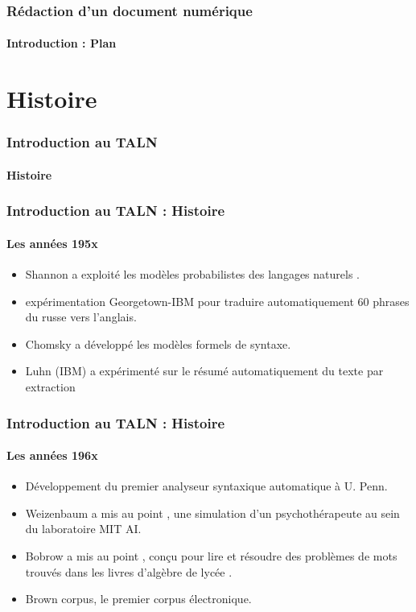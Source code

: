 \documentclass{beamer}
\begin{document}
\begin{frame}
\frametitle{Rédaction d'un document numérique}
\framesubtitle{Introduction : Plan}

\begin{multicols}{2}
\tableofcontents
\end{multicols}
\end{frame}

\section{Histoire}

\begin{frame}
\frametitle{Introduction au TALN}
\framesubtitle{Histoire}


\end{frame}


\begin{frame}
\frametitle{Introduction au TALN : Histoire}
\framesubtitle{Les années 195x}

\begin{itemize}
	\item {} Shannon a exploité les modèles probabilistes des langages naturels \cite{1951-shannon}.
	\item {} expérimentation Georgetown-IBM pour traduire automatiquement 60 phrases du russe vers l'anglais.
	\item {} Chomsky a développé les modèles formels de syntaxe.
	\item {} Luhn (IBM) a expérimenté sur le résumé automatiquement du texte par extraction \cite{1958-luhn}
\end{itemize}

\end{frame}

\begin{frame}
\frametitle{Introduction au TALN : Histoire}
\framesubtitle{Les années 196x}

\begin{itemize}
	\item {} Développement du premier analyseur syntaxique automatique à U. Penn. \cite{1961-joshi,1962-harris} 
	\item {} Weizenbaum a mis au point , une simulation d'un psychothérapeute au sein du laboratoire MIT AI.
	\item {} Bobrow a mis au point , conçu pour lire et résoudre des problèmes de mots trouvés dans les livres d'algèbre de lycée \cite{1964-bobrow}.
	\item {} Brown corpus, le premier corpus électronique.
\end{itemize}

\end{frame}
\end{document}
